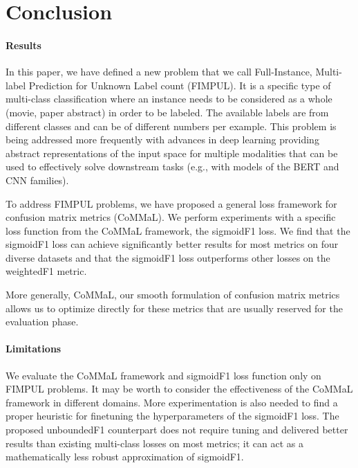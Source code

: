 
\section{Conclusion}
\label{sec:orged3d8a1}


\paragraph{Results}
In this paper, we have defined a new problem that we call Full-Instance, Multi-label Prediction for Unknown Label count (FIMPUL). It is a specific type of multi-class classification where an instance needs to be considered as a whole (movie, paper abstract) in order to be labeled. The available labels are from different classes and can be of different numbers per example. This problem is being addressed more frequently with advances in deep learning providing abstract representations of the input space for multiple modalities that can be used to effectively solve downstream tasks (e.g., with models of the BERT and CNN families). 

To address FIMPUL problems, we have proposed a general loss framework for confusion matrix metrics (CoMMaL). We perform experiments with a specific loss function from the CoMMaL framework, the sigmoidF1 loss. We find that the sigmoidF1 loss can achieve significantly better results for most metrics on four diverse datasets and that the sigmoidF1 loss outperforms other losses on the weightedF1 metric.

More generally, CoMMaL, our smooth formulation of confusion matrix metrics allows us to optimize directly for these metrics that are usually reserved for the evaluation phase. 

\paragraph{Limitations}
We evaluate the CoMMaL framework and sigmoidF1 loss function only on FIMPUL problems. It may be worth to consider the effectiveness of the CoMMaL framework in different domains. More experimentation is also needed to find a proper heuristic for finetuning the hyperparameters of the sigmoidF1 loss. The proposed unboundedF1 counterpart does not require tuning and delivered better results than existing multi-class losses on most metrics; it can act as a mathematically less robust approximation of sigmoidF1.

